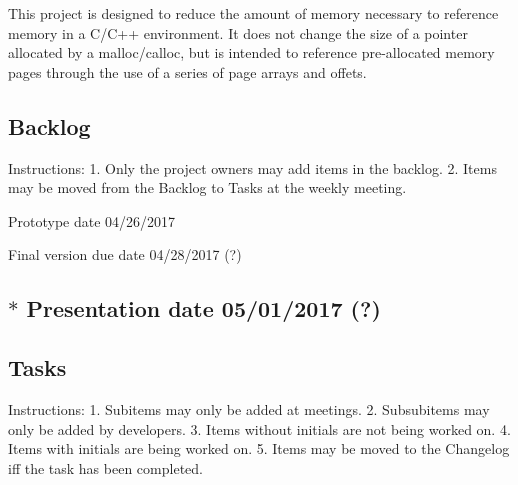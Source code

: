 This project is designed to reduce the amount of memory necessary to reference memory in a C/\+C++ environment. It does not change the size of a pointer allocated by a malloc/calloc, but is intended to reference pre-\/allocated memory pages through the use of a series of page arrays and offets.

\subsection*{Backlog}

\begin{DoxyVerb}Instructions:
1. Only the project owners may add items in the backlog.
2. Items may be moved from the Backlog to Tasks at the
   weekly meeting.
\end{DoxyVerb}



\begin{DoxyItemize}
\item Prototype date 04/26/2017
\item Final version due date 04/28/2017 (?) \subsection*{$\ast$ Presentation date 05/01/2017 (?) }
\end{DoxyItemize}

\subsection*{Tasks}

\begin{DoxyVerb}Instructions:
1. Subitems may only be added at meetings.
2. Subsubitems may only be added by developers.
3. Items without initials are not being worked on.
4. Items with initials are being worked on.
5. Items may be moved to the Changelog iff the task
   has been completed.
\end{DoxyVerb}



